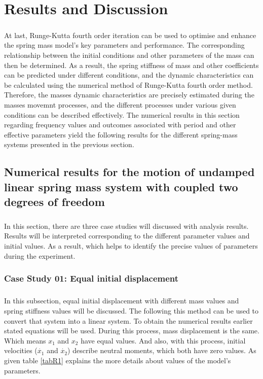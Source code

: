 \chapter{Results and Discussion}
\label{chap:05}
\paragraph{}

At last, Runge-Kutta fourth order iteration can be used to optimise and enhance the spring mass model's key parameters and performance. The corresponding relationship between the initial conditions and other parameters of the mass can then be determined. As a result, the spring stiffness of mass and other coefficients can be predicted under different conditions, and the dynamic characteristics can be calculated using the numerical method of Runge-Kutta fourth order method. Therefore, the masses dynamic characteristics are precisely estimated during the masses movemnt processes, and the different processes under various given conditions can be described effectively. The numerical results in this section regarding frequency values and outcomes associated with period and other effective parameters yield the following results for the different spring-mass systems presented in the previous section.

\section{Numerical results for the motion of undamped linear spring mass system with coupled two degrees of freedom}
\paragraph{}

In this section, there are three case studies will discussed with analysis results. Results will be interpreted corresponding to the  different parameter values and initial values. As a result, which helps to identify the precise values of parameters during the experiment. 

\subsection{Case Study 01: Equal initial displacement}
\paragraph{}
 In this subsection, equal initial displacement with different mass values and spring stiffness values will be discussed. The following this method can be used to convert that system into a linear system. To obtain the numerical results earlier stated equations will be used. During this process, mass displacement is the same. Which means $x_1$ and $x_2$ have equal values. And also, with this process, initial velocities ($\Dot{x_1}$ and $\Dot{x_2}$) describe neutral moments, which both have zero values. As given table \ref{tabR1} explains the more details about values of the model's parameters.    
\newpage

